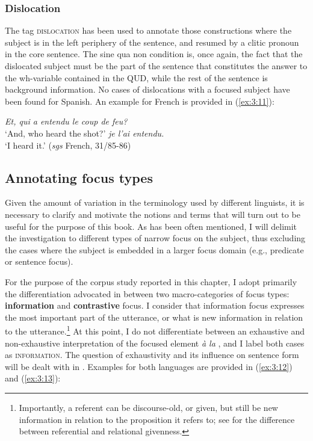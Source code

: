 \subsubsection{Dislocation}
The tag \textsc{dislocation} has been used to annotate those constructions where the subject is in the left periphery of the sentence, and resumed by a clitic pronoun in the core sentence. The sine qua non condition is, once again, the fact that the dislocated subject must be the part of the sentence that constitutes the answer to the wh-variable contained in the QUD, while the rest of the sentence is background information. No cases of dislocations with a focused subject have been found for Spanish. An example for French is provided in (\ref{ex:3:11}):

 \ea \label{ex:3:11}
\ea  \textit{Et, qui a entendu le coup de feu?} \\
 ‘And, who heard the shot?'
 \normalsize\textit{je l'ai entendu.} \\
‘I heard it.' \hfill (\textit{sgs} French, 31/85-86)    
\z \z  


\subsection{Annotating focus types} \label{sub:4.4.2}

Given the amount of variation in the terminology used by different linguists, it is necessary to clarify and motivate the notions and terms that will turn out to be useful for the purpose of this book. As has been often mentioned, I will delimit the investigation to different types of narrow focus on the subject, thus excluding the cases where the subject is embedded in a larger focus domain (e.g., predicate or sentence focus).

For the purpose of the corpus study reported in this chapter, I adopt primarily the differentiation advocated in \textcite{krifka2008basic} between two macro-categories of focus types: \textbf{information} and \textbf{contrastive} focus. I consider that information focus expresses the most important part of the utterance, or what is new information in relation to the utterance.\footnote{Importantly, a referent can be discourse-old, or given, but still be new information in relation to the proposition it refers to; see \textcite{gundel2004topic} for the difference between referential and relational givenness.} At this point, I do not differentiate between an exhaustive and non-exhaustive interpretation of the focused element  \textit{à la} \textcite{kiss1998identificational}, and I label both cases as \textsc{information}. The question of exhaustivity and its influence on sentence form will be dealt with in . Examples for both languages are provided in (\ref{ex:3:12}) and (\ref{ex:3:13}):

